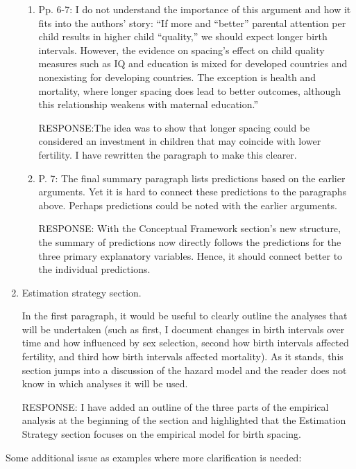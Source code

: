 \documentclass[letterpaper,12pt]{article}
\begin{document}
\begin{enumerate}
\begin{enumerate}
\item  Pp. 6-7: I do not understand the importance of this argument and how it fits into the
authors’ story: “If more and “better” parental attention per child results in higher child
“quality,” we should expect longer birth intervals. However, the evidence on spacing’s
effect on child quality measures such as IQ and education is mixed for developed countries
and nonexisting for developing countries. The exception is health and mortality, where
longer spacing does lead to better outcomes, although this relationship weakens with
maternal education.”

RESPONSE:The idea was to show that longer spacing could be considered an investment in
children that may coincide with lower fertility. 
I have rewritten the paragraph to make this clearer.

\item  P. 7: The final summary paragraph lists predictions based on the earlier arguments. Yet
it is hard to connect these predictions to the paragraphs above. Perhaps predictions could
be noted with the earlier arguments.

RESPONSE: With the Conceptual Framework section's new structure, 
the summary of predictions now directly follows the predictions for the three primary
explanatory variables. Hence, it should connect better to the individual predictions. 

\end{enumerate}


\item  Estimation strategy section.

In the first paragraph, it would be useful to clearly outline the analyses that will be
undertaken (such as first, I document changes in birth intervals over time and how
influenced by sex selection, second how birth intervals affected fertility, and third how
birth intervals affected mortality). As it stands, this section jumps into a discussion of
the hazard model and the reader does not know in which analyses it will be used.

RESPONSE: I have added an outline of the three parts of the empirical analysis at the 
beginning of the section and highlighted that the Estimation Strategy section focuses
on the empirical model for birth spacing.

\end{enumerate}

\noindent Some additional issue as examples where more clarification is needed:
\end{document}
